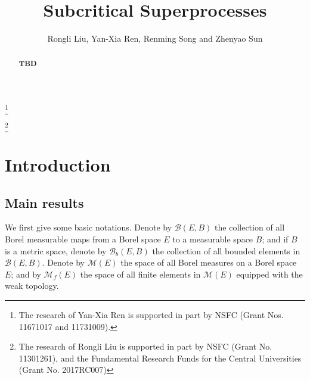 \documentclass[12pt,a4paper]{amsart}
\numberwithin{equation}{section}
\theoremstyle{plain}
\theoremstyle{definition}
\theoremstyle{remark}
\begin{document}
\title {Subcritical Superprocesses }
\author[R. Liu, Y.-X. Ren, R. Song and Z. Sun]{Rongli Liu, Yan-Xia Ren, Renming Song and Zhenyao Sun}
\address{Yan-Xia Ren\\ School of Mathematical Sciences\\ Peking University\\ Beijing, P. R. China, 100871}
\thanks{The research of Yan-Xia Ren is supported in part by NSFC (Grant Nos. 11671017 and 11731009).}
\address{Rongli Liu\\ \textbf{Information about Rongli Liu}}
\thanks{The research of Rongli Liu is supported in part by NSFC (Grant No. 11301261), and the Fundamental Research Funds for the Central Universities (Grant No.  2017RC007)}
\address{Renming Song\\ Information about Renming Song}
\address{Zhenyao Sun\\ School of Mathematical Sciences\\ Peking University\\ Beijing, P. R. China, 100871}
\begin{abstract}
  {\bf TBD}
\end{abstract}
\maketitle
\section{Introduction}
\subsection{Main results} \label{sec:IR}

We first give some basic notations. Denote by $\mathcal B(E,B)$ the collection of all Borel measurable maps from a Borel space $E$ to a measurable space $B$; and if $B$ is a metric space, denote by $\mathcal B_b(E,B)$ the collection of all bounded elements in $\mathcal B(E,B)$. Denote by $\mathcal M(E)$ the space of all Borel measures on a Borel space $E$; and by $\mathcal M_f(E)$ the space of all finite elements in $\mathcal M(E)$ equipped with the weak topology. 
\end{document}

